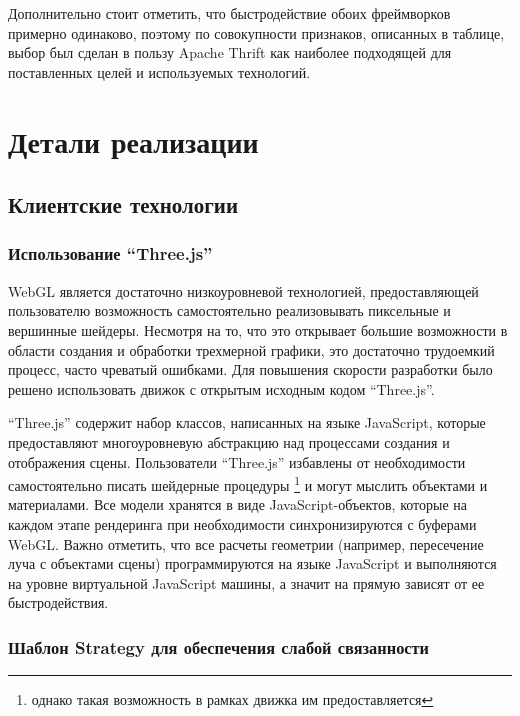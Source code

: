 \documentclass[12pt, a4paper]{article}
\let\stdsection\section
\renewcommand\section{\newpage\stdsection}
\begin{document}
Дополнительно стоит отметить, что быстродействие обоих фреймворков примерно
одинаково, поэтому по совокупности признаков, описанных в таблице, выбор был
сделан в пользу Apache Thrift как наиболее подходящей для поставленных целей и
используемых технологий.

\section{Детали реализации}

\subsection{Клиентские технологии}

\subsubsection{Использование ``Three.js''}

WebGL является достаточно низкоуровневой технологией, предоставляющей
пользователю возможность самостоятельно реализовывать пиксельные и вершинные
шейдеры.
Несмотря на то, что это открывает большие возможности в области создания и
обработки трехмерной графики, это достаточно трудоемкий процесс, часто чреватый
ошибками. Для повышения скорости разработки было решено использовать движок с
открытым исходным кодом ``Three.js''.

``Three.js'' содержит набор классов, написанных на языке JavaScript, которые
предоставляют многоуровневую абстракцию над процессами создания и отображения
сцены. Пользователи ``Three.js'' избавлены от необходимости самостоятельно писать
шейдерные процедуры \footnote{однако такая возможность в рамках движка им
предоставляется} и могут мыслить объектами и материалами. Все модели
хранятся в виде JavaScript-объектов, которые на каждом этапе рендеринга при
необходимости синхронизируются с буферами WebGL. Важно отметить, что все
 расчеты геометрии (например, пересечение луча с объектами сцены)
программируются на языке JavaScript и выполняются на уровне виртуальной
JavaScript машины, а значит на прямую зависят от ее быстродействия.

\subsubsection{Шаблон Strategy для обеспечения слабой связанности}
\end{document}
